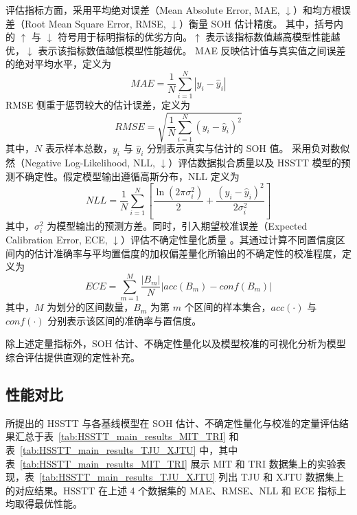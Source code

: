 评估指标方面，采用平均绝对误差（Mean Absolute Error, MAE, $\downarrow$）和均方根误差（Root Mean Square Error, RMSE, $\downarrow$）衡量 SOH 估计精度。
其中，括号内的 $\uparrow$ 与 $\downarrow$ 符号用于标明指标的优劣方向。$\uparrow$ 表示该指标数值越高模型性能越优，$\downarrow$ 表示该指标数值越低模型性能越优。
MAE 反映估计值与真实值之间误差的绝对平均水平，定义为
% 
\begin{equation}
  MAE = \frac{1}{N} \sum_{i=1}^{N} |y_i - \hat{y}_i|
\end{equation}
% 
RMSE 侧重于惩罚较大的估计误差，定义为
% 
\begin{equation}
  RMSE = \sqrt{\frac{1}{N} \sum_{i=1}^{N} (y_i - \hat{y}_i)^2}
\end{equation}
% 
其中，$N$ 表示样本总数，$y_i$ 与 $\hat{y}_i$ 分别表示真实与估计的 SOH 值。
% 
采用负对数似然（Negative Log-Likelihood, NLL, $\downarrow$）评估数据拟合质量以及 HSSTT 模型的预测不确定性。假定模型输出遵循高斯分布，NLL 定义为
% 
\begin{equation}
  NLL = \frac{1}{N} \sum_{i=1}^{N} \left[ \frac{\ln(2\pi\sigma_i^2)}{2} + \frac{(y_i - \hat{y}_i)^2}{2\sigma_i^2} \right]
\end{equation}
% 
其中，$\sigma_i^2$ 为模型输出的预测方差。同时，引入期望校准误差（Expected Calibration Error, ECE, $\downarrow$）评估不确定性量化质量 \cite{kuleshov2018accurate, nemani2023uncertainty}。其通过计算不同置信度区间内的估计准确率与平均置信度的加权偏差量化所输出的不确定性的校准程度，定义为
% 
\begin{equation}
  ECE = \sum_{m=1}^{M} \frac{|B_m|}{N} |acc(B_m) - conf(B_m)|
\end{equation}
% 
其中，$M$ 为划分的区间数量，$B_m$ 为第 $m$ 个区间的样本集合，$acc(\cdot)$ 与 $conf(\cdot)$ 分别表示该区间的准确率与置信度。

除上述定量指标外，SOH 估计、不确定性量化以及模型校准的可视化分析为模型综合评估提供直观的定性补充。

\subsection{性能对比}\label{subsec:HSSTT_comparison_experiment}

所提出的 HSSTT 与各基线模型在 SOH 估计、不确定性量化与校准的定量评估结果汇总于表~\ref{tab:HSSTT_main_results_MIT_TRI} 和表~\ref{tab:HSSTT_main_results_TJU_XJTU} 中，其中表~\ref{tab:HSSTT_main_results_MIT_TRI} 展示 MIT 和 TRI 数据集上的实验表现，表~\ref{tab:HSSTT_main_results_TJU_XJTU} 列出 TJU 和 XJTU 数据集上的对应结果。HSSTT 在上述 4 个数据集的 MAE、RMSE、NLL 和 ECE 指标上均取得最优性能。

